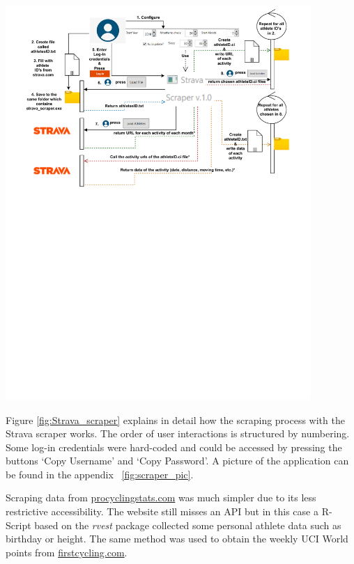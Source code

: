 \documentclass[12pt,a4paper]{article}
\let\origfigure\figure
\let\endorigfigure\endfigure
\renewenvironment{figure}[1][2] {
    \expandafter\origfigure\expandafter[H]
} {
    \endorigfigure
}
\begin{document}
\begin{figure}
\hspace{-1.cm}\includegraphics[height = 15cm, width = 15 cm, trim=0in 5.8in 0in 0.1in,clip]{./includes/Strava_scraper_final.pdf}
    \caption{Diagram of the working process of the Strava scraper. All user interactions are marked by full line arrows, all automized interactions by the Strava scraper are highlighted by coloured dotted arrows. Colours were added just for visual purpose. "*" - signs at the end of a description indicate that this process interacts with Strava.com. Therefore a sleep time after each url call is used to prevent a timeout.}
    \label{fig:Strava_scraper}
\end{figure}

Figure \ref{fig:Strava_scraper} explains in detail how the scraping process with the Strava scraper works. The order of user interactions is structured by numbering. Some log-in credentials were hard-coded and could be accessed by pressing the buttons `Copy Username' and `Copy Password'. A picture of the application can be found in the appendix ~\ref{fig:scraper_pic}.

Scraping data from \href{procycilingstats.com}{procyclingstats.com} was much simpler due to its less restrictive accessibility. The website still misses an API but in this case a R-Script based on the \textit{rvest} package collected some personal athlete data such as birthday or height. The same method was used to obtain the weekly UCI World points from \href{firstcycling.com}{firstcycling.com}.
\end{document}

